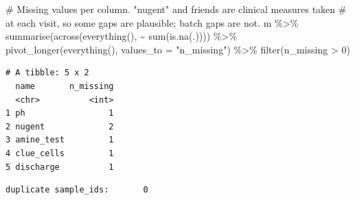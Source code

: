 \documentclass[
  letterpaper,
  DIV=11,
  numbers=noendperiod]{scrartcl}
\newenvironment{Shaded}{\begin{snugshade}}{\end{snugshade}}
\newcommand{\AttributeTok}[1]{\textcolor[rgb]{0.40,0.45,0.13}{#1}}
\newcommand{\CommentTok}[1]{\textcolor[rgb]{0.37,0.37,0.37}{#1}}
\newcommand{\DecValTok}[1]{\textcolor[rgb]{0.68,0.00,0.00}{#1}}
\newcommand{\FunctionTok}[1]{\textcolor[rgb]{0.28,0.35,0.67}{#1}}
\newcommand{\NormalTok}[1]{\textcolor[rgb]{0.00,0.23,0.31}{#1}}
\newcommand{\SpecialCharTok}[1]{\textcolor[rgb]{0.37,0.37,0.37}{#1}}
\newcommand{\StringTok}[1]{\textcolor[rgb]{0.13,0.47,0.30}{#1}}
\begin{document}
\begin{Shaded}
\begin{Highlighting}[]
\CommentTok{\# Missing values per column. "nugent" and friends are clinical measures taken}
\CommentTok{\# at each visit, so some gaps are plausible; batch gaps are not.}
\NormalTok{m }\SpecialCharTok{\%\textgreater{}\%} \FunctionTok{summarise}\NormalTok{(}\FunctionTok{across}\NormalTok{(}\FunctionTok{everything}\NormalTok{(), }\SpecialCharTok{\textasciitilde{}} \FunctionTok{sum}\NormalTok{(}\FunctionTok{is.na}\NormalTok{(.)))) }\SpecialCharTok{\%\textgreater{}\%}
  \FunctionTok{pivot\_longer}\NormalTok{(}\FunctionTok{everything}\NormalTok{(), }\AttributeTok{values\_to =} \StringTok{"n\_missing"}\NormalTok{) }\SpecialCharTok{\%\textgreater{}\%} \FunctionTok{filter}\NormalTok{(n\_missing }\SpecialCharTok{\textgreater{}} \DecValTok{0}\NormalTok{)}
\end{Highlighting}
\end{Shaded}

\begin{verbatim}
# A tibble: 5 x 2
  name       n_missing
  <chr>          <int>
1 ph                 1
2 nugent             2
3 amine_test         1
4 clue_cells         1
5 discharge          1
\end{verbatim}

\begin{Shaded}
\end{Shaded}

\begin{verbatim}
duplicate sample_ids:       0 
\end{verbatim}

\begin{Shaded}
\end{Shaded}
\end{document}
